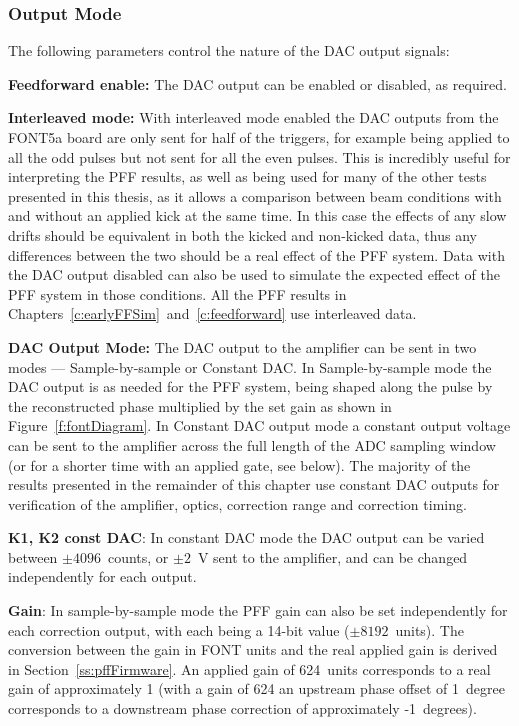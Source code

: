 \subsubsection{Output Mode}

The following parameters control the nature of the DAC output signals:

\textbf{Feedforward enable:} The DAC output can be enabled or disabled, as required.

\textbf{Interleaved mode:} With interleaved mode enabled the DAC outputs from the FONT5a board are only sent for half of the triggers, for example being applied to all the odd pulses but not sent for all the even pulses. This is incredibly useful for interpreting the PFF results, as well as being used for many of the other tests presented in this thesis, as it allows a comparison between beam conditions with and without an applied kick at the same time. In this case the effects of any slow drifts should be equivalent in both the kicked and non-kicked data, thus any differences between the two should be a real effect of the PFF system. Data with the DAC output disabled can also be used to simulate the expected effect of the PFF system in those conditions. All the PFF results in Chapters~\ref{c:earlyFFSim}~and~\ref{c:feedforward} use interleaved data.

\textbf{DAC Output Mode:} The DAC output to the amplifier can be sent in two modes --- Sample-by-sample or Constant DAC. In Sample-by-sample mode the DAC output is as needed for the PFF system, being shaped along the pulse by the reconstructed phase multiplied by the set gain as shown in Figure~\ref{f:fontDiagram}. In Constant DAC output mode a constant output voltage can be sent to the amplifier across the full length of the ADC sampling window (or for a shorter time with an applied gate, see below). The majority of the results presented in the remainder of this chapter use constant DAC outputs for verification of the amplifier, optics, correction range and correction timing.

\textbf{K1, K2 const DAC}: In constant DAC mode the DAC output can be varied between \(\pm4096\)~counts, or \(\pm2\)~V sent to the amplifier, and can be changed independently for each output.

\textbf{Gain}: In sample-by-sample mode the PFF gain can also be set independently for each correction output, with each being a 14-bit value (\(\pm8192\)~units). The conversion between the gain in FONT units and the real applied gain is derived in Section~\ref{ss:pffFirmware}. An applied gain of 624~units corresponds to a real gain of approximately 1 (with a gain of 624 an upstream phase offset of 1~degree corresponds to a downstream phase correction of approximately -1~degrees).

